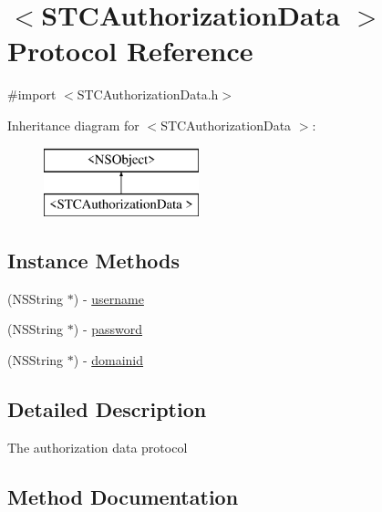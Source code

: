\hypertarget{protocol_s_t_c_authorization_data_01-p}{}\section{$<$S\+T\+C\+Authorization\+Data $>$ Protocol Reference}
\label{protocol_s_t_c_authorization_data_01-p}


{\ttfamily \#import $<$S\+T\+C\+Authorization\+Data.\+h$>$}

Inheritance diagram for $<$S\+T\+C\+Authorization\+Data $>$\+:\begin{figure}[H]
\begin{center}
\leavevmode
\includegraphics[height=2.000000cm]{protocol_s_t_c_authorization_data_01-p}
\end{center}
\end{figure}
\subsection*{Instance Methods}
\begin{DoxyCompactItemize}
\item 
(N\+S\+String $\ast$) -\/ \hyperlink{protocol_s_t_c_authorization_data_01-p_a76a855efaf3316cf28942a48a8ca6a64}{username}
\item 
(N\+S\+String $\ast$) -\/ \hyperlink{protocol_s_t_c_authorization_data_01-p_a63e5d838e9bd17abdace07884a121682}{password}
\item 
(N\+S\+String $\ast$) -\/ \hyperlink{protocol_s_t_c_authorization_data_01-p_a72c695bc62f6091f08eb3235b9203685}{domainid}
\end{DoxyCompactItemize}


\subsection{Detailed Description}
The authorization data protocol 

\subsection{Method Documentation}
\hypertarget{protocol_s_t_c_authorization_data_01-p_a72c695bc62f6091f08eb3235b9203685}{}\label{protocol_s_t_c_authorization_data_01-p_a72c695bc62f6091f08eb3235b9203685} 
